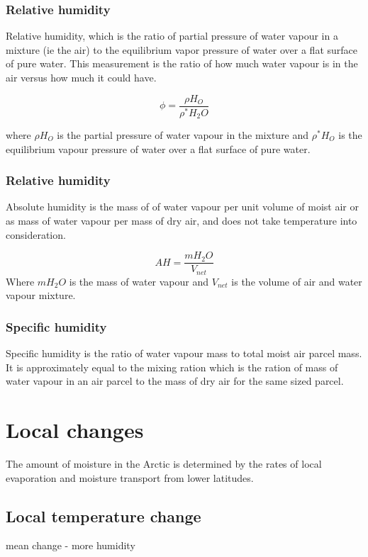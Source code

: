 \documentclass[11pt, oneside]{article}
\begin{document}
\subsubsection{Relative humidity}
Relative humidity, which is the ratio of partial pressure of water vapour in a mixture (ie the air) to the equilibrium vapor pressure of water over a flat surface of pure water. This measurement is the ratio of how much water vapour is in the air versus how much it could have. 

\begin{equation}
    \phi = \frac{\rho H_O}{\rho^* H_2O}
\end{equation}

where $\rho H_O$ is the partial pressure of water vapour in the mixture and $\rho^* H_O$ is the equilibrium vapour pressure of water over a flat surface of pure water. 


\subsubsection{Relative humidity}
Absolute humidity is the mass of of water vapour per unit volume of moist air or as mass of water vapour per mass of dry air, and does not take temperature into consideration.

\begin{equation}
    AH = \frac{mH_2O}{V_{net}}
\end{equation}
Where $mH_2O$ is the mass of water vapour and $V_{net}$ is the volume of air and water vapour mixture. 



\subsubsection{Specific humidity}
Specific humidity is the ratio of water vapour mass to total moist air parcel mass. It is approximately equal to the mixing ration which is  the ration of mass of water vapour in an air parcel to the mass of dry air for the same sized parcel. 



\section{Local changes}
The amount of moisture in the Arctic is determined by the rates of local evaporation and moisture transport from lower latitudes.

\subsection{Local temperature change}
mean change - more humidity 
\end{document}
